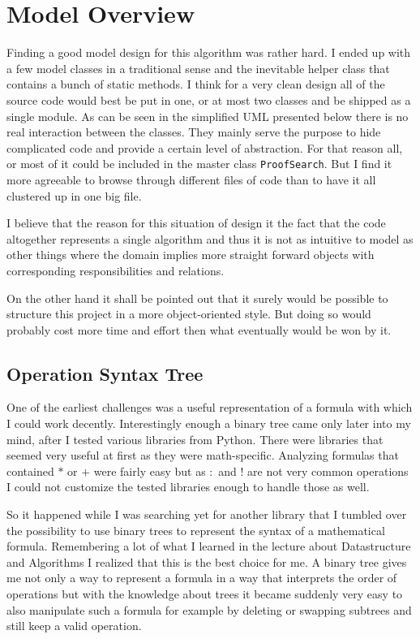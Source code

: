 \section{Model Overview}
Finding a good model design for this algorithm was rather hard. I ended up with a few model classes in a traditional sense and the inevitable helper class that contains a bunch of static methods. I think for a very clean design all of the source code would best be put in one, or at most two classes and be shipped as a single module. As can be seen in the simplified UML presented below there is no real interaction between the classes. They mainly serve the purpose to hide complicated code and provide a certain level of abstraction. For that reason all, or most of it could be included in the master class \texttt{ProofSearch}. But I find it more agreeable to browse through different files of code than to have it all clustered up in one big file.

I believe that the reason for this situation of design it the fact that the code altogether represents a single algorithm and thus it is not as intuitive to model as other things where the domain implies more straight forward objects with corresponding responsibilities and relations.

On the other hand it shall be pointed out that it surely would be possible to structure this project in a more object-oriented style. But doing so would probably cost more time and effort then what eventually would be won by it.

\subsection{Operation Syntax Tree}
One of the earliest challenges was a useful representation of a formula with which I could work decently. Interestingly enough a binary tree came only later into my mind, after I tested various libraries from Python. There were libraries that seemed very useful at first as they were math-specific. Analyzing formulas that contained $*$ or $+$ were fairly easy but as $:$ and $!$ are not very common operations I could not customize the tested libraries enough to handle those as well.

So it happened while I was searching yet for another library that I tumbled over the possibility to use binary trees to represent the syntax of a mathematical formula. Remembering a lot of what I learned in the lecture about Datastructure and Algorithms I realized that this is the best choice for me. A binary tree gives me not only a way to represent a formula in a way that interprets the order of operations but with the knowledge about trees it became suddenly very easy to also manipulate such a formula for example by deleting or swapping subtrees and still keep a valid operation. 


